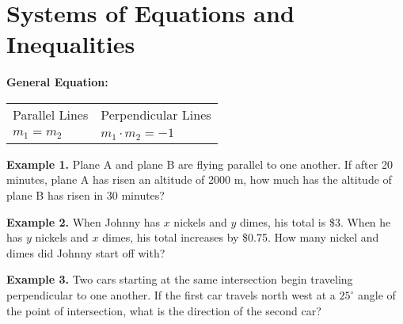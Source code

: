 \section[System of Equations]{Systems of Equations and Inequalities}

\bigskip
\textbf{General Equation:} 

\bigskip
\begin{tabularx}{\textwidth}{*2{@{}>{\centering\arraybackslash}X}}
Parallel Lines & Perpendicular Lines\\
$m_1 = m_2$ & $m_1 \cdot m_2 = -1$
\end{tabularx}

\vfill
\textbf{Example 1.} Plane A and plane B are flying parallel to one another. If after 20 minutes, plane A has risen an altitude of 2000 m, how much has the altitude of plane B has risen in 30 minutes?

\vfill
\textbf{Example 2.} When Johnny has $x$ nickels and $y$ dimes, his total is \$3. When he has $y$ nickels and $x$ dimes, his total increases by \$0.75. How many nickel and dimes did Johnny start off with?

\vfill
\textbf{Example 3.} Two cars starting at the same intersection begin traveling perpendicular to one another. If the first car travels north west at a $25^\circ$ angle of the point of intersection, what is the direction of the second car?

